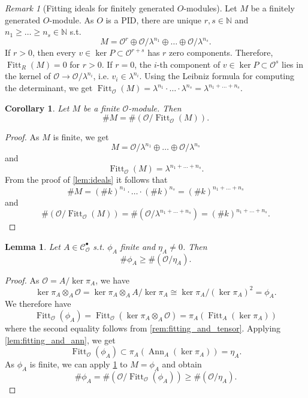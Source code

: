 \documentclass{article}
\theoremstyle{plain}%
\newtheorem{lemma}[theorem]{Lemma}
\newtheorem{corollary}[theorem]{Corollary}
\theoremstyle{definition}
\theoremstyle{remark}
\newtheorem{remark}[theorem]{Remark}
\newcommand{\cob}{\mathcal{C}_\mathcal{O}^\bullet}
\newcommand{\ann}{\operatorname{Ann}}
\newcommand{\fitt}{\operatorname{Fitt}}
\begin{document}
\begin{remark}[Fitting ideals for finitely generated \(O\)-modules]
    Let \(M\) be a finitely generated \(O\)-module. As \(O\) is a PID, there are unique \(r,s \in \mathbb{N}\) 
    and \(n_1 \geq \dots \geq n_s \in \mathbb{N}\) s.t.
    \[
        M = \mathcal{O}^r \oplus \mathcal{O}/\lambda^{n_1} \oplus \dots \oplus \mathcal{O}/\lambda^{n_s}.
    \]
    If \(r > 0\), then every \(v \in \ker P \subset \mathcal{O}^{r + s}\) has \(r\) zero components.
    Therefore, \(\fitt_R (M) = 0\) for \(r > 0\).
    If \(r = 0\), the \(i\)-th component of \(v \in \ker P \subset \mathcal{O}^s\) 
    lies in the kernel of \(\mathcal{O} \to \mathcal{O}/\lambda^{n_i}\), 
    i.e. \(v_i \in \lambda^{n_i}\).
    Using the Leibniz formula for computing the determinant, we get
    \(\fitt_\mathcal{O}(M) = \lambda^{n_1} \cdot \dots \cdot \lambda^{n_s} = \lambda^{n_1 + \dots + n_s}\).
\end{remark}

\begin{corollary}\label{cor:fitting_finite}
    Let \(M\) be a finite \(\mathcal{O}\)-module. Then
    \[
        \# M = \# (\mathcal{O}/\fitt_\mathcal{O}(M)). 
    \]
\end{corollary}
\begin{proof}
    As \(M\) is finite, we get
    \[
        M = \mathcal{O}/\lambda^{n_1} \oplus \dots \oplus \mathcal{O}/\lambda^{n_s}
    \]
    and 
    \[
        \fitt_\mathcal{O}(M) = \lambda^{n_1 + \dots + n_s}.
    \]
    From the proof of \cref{lem:ideals} it follows that
    \[\# M = (\# k)^{n_1} \cdot \dots \cdot (\# k)^{n_s} = (\# k)^{n_1 + \dots + n_s}\]
    and
    \[
        \# (\mathcal{O}/\fitt_\mathcal{O}(M)) = \# (\mathcal{O}/\lambda^{n_1 + \dots + n_s}) = (\# k)^{n_1 + \dots + n_s}.
    \]
\end{proof}

\begin{lemma}\label{lem:standard_ineq}
    Let \(A \in \cob\) s.t. \(\phi_A\) finite and \(\eta_A \neq 0\). Then \[\#\phi_A \geq \#(\mathcal{O}/\eta_A).\]
\end{lemma}
\begin{proof}
    As \(\mathcal{O} = A/\ker \pi_A\), we have
    \[
        \ker \pi_A \otimes_A \mathcal{O} = \ker \pi_A \otimes_A A/\ker \pi_A \cong \ker \pi_A/(\ker \pi_A)^2 = \phi_A.
    \]
    We therefore have
    \[
        \fitt_\mathcal{O}(\phi_A) = \fitt_\mathcal{O}(\ker \pi_A \otimes_A\mathcal{O}) = \pi_A(\fitt_A(\ker \pi_A))
    \]
    where the second equality follows from \cref{rem:fitting_and_tensor}.
    Applying \cref{lem:fitting_and_ann}, we get
    \[
        \fitt_\mathcal{O}(\phi_A) \subset \pi_A(\ann_A(\ker \pi_A)) = \eta_A.
    \]
    As \(\phi_A\) is finite, we can apply \cref{cor:fitting_finite} to \(M = \phi_A\) and obtain
    \[
        \# \phi_A = \# (\mathcal{O}/\fitt_\mathcal{O}(\phi_A)) \geq \# (\mathcal{O}/\eta_A).
    \]
\end{proof}
\end{document}
